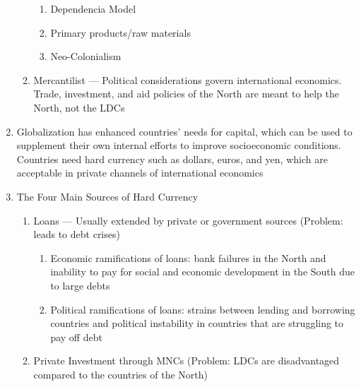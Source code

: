 \documentclass[12pt]{article}
\begin{document}
\begin{enumerate}
\begin{enumerate}
\begin{enumerate}
              \item Dependencia Model

              \item Primary products/raw materials

              \item Neo-Colonialism

            \end{enumerate}

          \item Mercantilist — Political considerations govern international economics. Trade, investment, and aid policies of the North are meant to help the North, not the LDCs

        \end{enumerate}

      \item Globalization has enhanced countries’ needs for capital, which can be used to supplement their own internal efforts to improve socioeconomic conditions. Countries need hard currency such as dollars, euros, and yen, which are acceptable in private channels of international economics

      \item The Four Main Sources of Hard Currency

        \begin{enumerate}

          \item Loans — Usually extended by private or government sources (Problem: leads to debt crises)

            \begin{enumerate}

              \item Economic ramifications of loans: bank failures in the North and inability to pay for social and economic development in the South due to large debts

              \item Political ramifications of loans: strains between lending and borrowing countries and political instability in countries that are struggling to pay off debt

            \end{enumerate}

          \item Private Investment through MNCs (Problem: LDCs are disadvantaged compared to the countries of the North)

            \begin{enumerate}


\end{enumerate}
\end{enumerate}
\end{enumerate}
\end{document}
